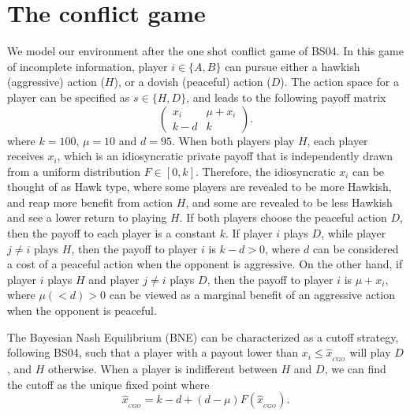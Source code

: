 \documentclass[12pt,english]{article}
\begin{document}
\section{The conflict game}
\label{sec:model}
We model our environment after the one shot conflict game of BS04. In this game of incomplete information, player $i\in\{A,B\}$ can pursue either a hawkish (aggressive) action ($H$), or a dovish (peaceful) action ($D$). The action space for a player can be specified as $s\in\{H,D\}$, and leads to the following payoff matrix
\begin{equation}
\begin{pmatrix}
x_i & \mu+x_i \\
k-d & k 
\label{t:payoff}
\end{pmatrix}.
\end{equation}
where $k=100$, $\mu=10$ and $d=95$. When both players play $H$, each player receives $x_i$, which is an idiosyncratic private payoff that is independently drawn from a uniform distribution $F\in [0,k]$. Therefore, the idiosyncratic $x_i$ can be thought of as Hawk type, where some players are revealed to be more Hawkish, and reap more benefit from action $H$, and some are revealed to be less Hawkish and see a lower return to playing $H$. If both players choose the peaceful action $D$, then the payoff to each player is a constant $k$. If player $i$ plays $D$, while player $j\neq i$ plays $H$, then the payoff to player $i$ is $k-d>0$, where $d$ can be considered a cost of a peaceful action when the opponent is aggressive. On the other hand, if player $i$ plays $H$ and player $j\neq i$ plays $D$, then the payoff to player $i$ is $\mu+x_i$, where $\mu (<d)>0$ can be viewed as a marginal benefit of an aggressive action when the opponent is peaceful. 

The Bayesian Nash Equilibrium (BNE) can be characterized as a cutoff strategy, following BS04, such that a player with a payout lower than $x_i\leq\hat{x}_{_{CGO}}$ will play $D$, and $H$ otherwise.  When a player is indifferent between $H$ and $D$, we can find the cutoff as the unique fixed point where 
\begin{equation}
\hat{x}_{_{CGO}}= k-d + (d-\mu) F(\hat{x}_{_{CGO}}). \label{eq:cgo}
\end{equation}
\end{document}
